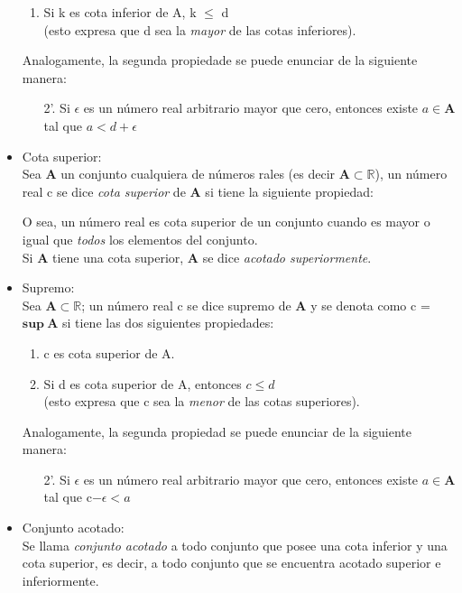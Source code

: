 \documentclass[a4paper,11pt]{report}
\begin{document}
\begin{itemize}
\begin{enumerate}
\item Si k es cota inferior de A, k $\leqslant$ d \\
(esto expresa que d sea la \emph{mayor} de las cotas inferiores).
\end{enumerate}
Analogamente, la segunda propiedade se puede enunciar de la siguiente manera:
\begin{itemize}
\item[2'.] Si $\epsilon$ es un número real arbitrario mayor que cero, entonces existe $a \in \mathbf{A}$ tal que $ a < d + \epsilon $
\end{itemize}
\item Cota superior: \\
Sea $\mathbf{A}$ un conjunto cualquiera de números rales (es decir $\mathbf{A} \subset \mathbb{R}$), un número real c se dice \emph{cota superior} de $\mathbf{A}$ si tiene la siguiente propiedad: 
O sea, un número real es cota superior de un conjunto cuando es mayor o igual que \emph{todos} los elementos del conjunto.\\ 
Si $\mathbf{A}$ tiene una cota superior, $\mathbf{A}$ se dice \emph{acotado superiormente}.
\item Supremo: \\
Sea $\mathbf{A} \subset \mathbb{R}$; un número real c se dice supremo de $\mathbf{A}$ y se denota como c = $\mathbf{sup\ A}$ si tiene las dos siguientes propiedades:
\begin{enumerate}
\item c es cota superior de A.
\item Si d es cota superior de A, entonces $ c \leqslant d $ \\
(esto expresa que c sea la \emph{menor} de las cotas superiores).
\end{enumerate}
Analogamente, la segunda propiedad se puede enunciar de la siguiente manera:
\begin{itemize}
\item[2'.] Si $\epsilon$ es un número real arbitrario mayor que cero, entonces existe $a \in \mathbf{A}$ tal que c$ - \epsilon < a$
\end{itemize}
\item Conjunto acotado: \\
Se llama \emph{conjunto acotado} a todo conjunto que posee una cota inferior y una cota superior, es decir, a todo conjunto que se encuentra acotado superior e inferiormente.

\end{itemize}
\end{document}
